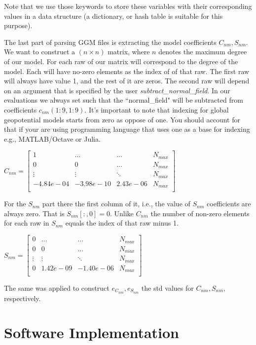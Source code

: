 	Note that we use those keywords to store these variables with their corresponding values in a data structure (a dictionary, or hash table is suitable for this purpose).
	
	The last part of parsing GGM files is extracting the model coefficients $C_{nm}, S_{nm}$. We want to construct a $(n \times n)$ matrix, where $n$ denotes the maximum degree of our model. For each raw of our matrix will correspond to the degree of the model. Each will have no-zero elements as the index of of that raw. The first raw will always have value 1, and the rest of it are zeros. The second raw will depend on an argument that is specified by the user \textit{subtract\_normal\_field}. In our evaluations we always set such that the ``normal\_field" will be subtracted from coefficients $c_{nm}(1:9,1:9)$. It's important to note that indexing for global geopotential models starts from zero as oppose of one. You should account for that if your are using programming language that uses one as a base for indexing e.g., MATLAB/Octave or Julia.
	
	\(
	C_{nm} = \begin{bmatrix}
		1 & \ldots & \ldots& N_{max}\\
		0 & 0 & \dots & N_{max}\\
		\vdots &\vdots &\ddots & N_{max}\\
		-4.84e-04 & -3.98e-10 & 2.43e-06 & N_{max}\\

	\end{bmatrix}
	\)
	
	For the $S_{nm}$ part there the first column of it, i.e., the value of $S_{nm}$ coefficients are always zero. That is $S_{nm}[:, 0] = 0$. Unlike $C_{nm}$ the number of non-zero elements for each raw in $S_{nm}$ equals the index of that raw minus 1.
	
	\(
		S_{nm} = \begin{bmatrix}
		0 & \ldots &\ldots & N_{max}\\
		0 & 0 & \dots & N_{max}\\
		\vdots &\vdots &\ddots & N_{max}\\
		0 &  1.42e-09& -1.40e-06 & N_{max}\\
		
		\end{bmatrix}
	\)
	

	The same was applied to construct $e_{C_{nm}}, e_{S_{nm}}$ the std values for $C_{nm}, S_{nm}$, respectively.


\section{Software Implementation}
